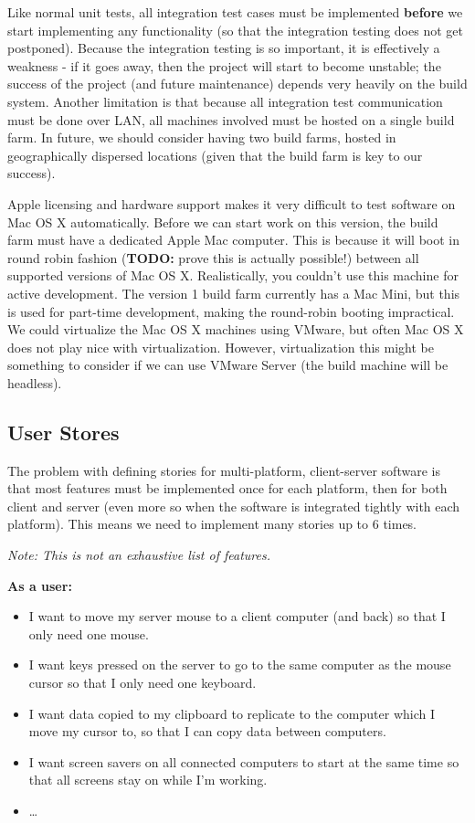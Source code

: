 Like normal unit tests, all integration test cases must be implemented 
\textbf{before} we start implementing any functionality (so that the integration
testing does not get postponed). Because the integration testing is so 
important, it is effectively a weakness - if it goes away, then the project will
start to become unstable; the success of the project (and future maintenance) 
depends very heavily on the build system. Another limitation is that because
all integration test communication must be done over LAN, all machines involved
must be hosted on a single build farm. In future, we should consider having two
build farms, hosted in geographically dispersed locations (given that the build
farm is key to our success).

Apple licensing and hardware support makes it very difficult to test software on
Mac OS X automatically. Before we can start work on this version, the build farm
must have a dedicated Apple Mac computer. This is because it will boot in round
robin fashion (\textbf{TODO:} prove this is actually possible!) between all 
supported versions of Mac OS X. Realistically, you couldn't use this machine 
for active development. The version 1 build farm currently has a Mac Mini, but
this is used for part-time development, making the round-robin booting
impractical. We could virtualize the Mac OS X machines using VMware, but often
Mac OS X does not play nice with virtualization. However, virtualization this 
might be something to consider if we can use VMware Server (the build machine
will be headless).

\subsection{User Stores}

The problem with defining stories for multi-platform, client-server software
is that most features must be implemented once for each platform, then for both
client and server (even more so when the software is integrated tightly with
each platform). This means we need to implement many stories up to 6 times.

\textit{Note: This is not an exhaustive list of features.}

\textbf{As a user:}

\begin{itemize}
  \item I want to move my server mouse to a client computer (and back) so that 
    I only need one mouse.
  \item I want keys pressed on the server to go to the same computer as the
    mouse cursor so that I only need one keyboard.
  \item I want data copied to my clipboard to replicate to the computer which
    I move my cursor to, so that I can copy data between computers.
  \item I want screen savers on all connected computers to start at the same
    time so that all screens stay on while I'm working.
  \item \ldots
\end{itemize}

